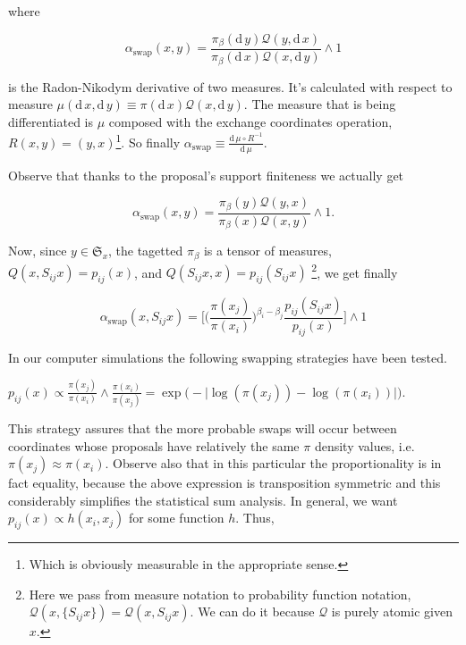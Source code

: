 where 

	$$\alpha_\text{swap}(x,y) = \frac{\pi_\beta( \mathrm{d}\, y ) \mathcal{Q}(y, \mathrm{d}\,x)}{\pi_\beta( \mathrm{d}\, x ) \mathcal{Q}(x, \mathrm{d}\,y)} \wedge 1$$

is the Radon-Nikodym derivative of two measures. It's calculated with respect to measure $ \mu (\mathrm{d}\,x, \mathrm{d}\,y) \equiv \pi(\mathrm{d}\,x) \mathcal{Q}(x, \mathrm{d}\,y)$. The measure that is being differentiated is $\mu$ composed with the exchange coordinates operation, $R(x,y) = (y,x)$\footnote{Which is obviously measurable in the appropriate sense.}. So finally $\alpha_\text{swap} \equiv \frac{\mathrm{d}\, \mu \circ R^{-1}}{\mathrm{d}\, \mu}$.

Observe that thanks to the proposal's support finiteness we actually get 

	$$\alpha_\text{swap}(x,y) =  \frac{\pi_\beta( y ) \mathcal{Q}(y, x)}{\pi_\beta( x ) \mathcal{Q}(x, y)} \wedge 1.$$


Now, since $y \in \mathfrak{S}_x $, the tagetted $\pi_\beta$ is a tensor of measures, $Q(x, S_{ij} x) = p_{ij}(x)$, and $Q( S_{ij} x, x) = p_{ij}(S_{ij}x)$ \footnote{Here we pass from measure notation to probability function notation, $\mathcal{Q}(x, \{S_{ij}x \}) = \mathcal{Q}(x, S_{ij}x)$. We can do it because $\mathcal{Q}$ is purely atomic given $x$.}, we get finally 

\begin{equation*}
	\alpha_\text{swap}(x,S_{ij} x) = \Big[  \Big(\frac{\pi(x_j)}{\pi(x_i)} \Big)^{\beta_i - \beta_j}  \frac{ p_{ij}(S_{ij} x )}{ p_{ij}( x ) }\Big] \wedge 1
\end{equation*}	

In our computer simulations the following swapping strategies have been tested.

\begin{strategy}
	\item 
		$
			p_{ij}(x) \propto 
			\frac{\pi (x_j)}{\pi( x_i )} \wedge \frac{\pi (x_i)}{\pi( x_j )} = 
			\exp \Big( - \big| \log ( \pi(x_j) ) - \log ( \pi(x_i) ) \big| \Big).
		$\label{strat1} 
\end{strategy}

This strategy assures that the more probable swaps will occur between coordinates whose proposals have relatively the same $\pi$ density values, i.e. $\pi (x_j) \approx \pi (x_i)$. Observe also that in this particular the proportionality is in fact equality, because the above expression is transposition symmetric and this considerably simplifies the statistical sum analysis. In general, we want $p_{ij}(x) \propto h(x_i,x_j)$ for some function $h$. Thus,

